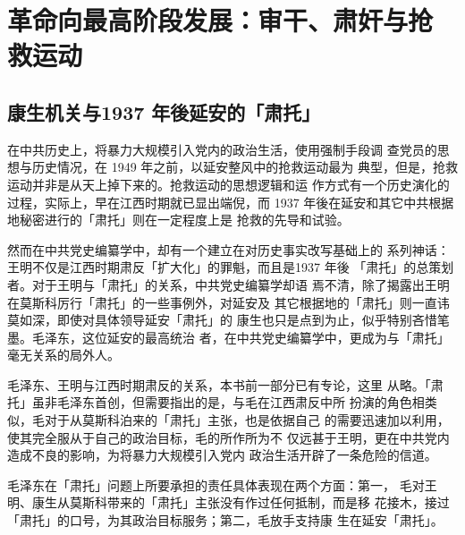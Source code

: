 \chapter{
革命向最高阶段发展：审干、肃奸与抢
救运动}

\section{康生机关与1937 年後延安的「肃托」}

在中共历史上，将暴力大规模引入党内的政治生活，使用强制手段调
查党员的思想与历史情况，在 1949 年之前，以延安整风中的抢救运动最为
典型，但是，抢救运动并非是从天上掉下来的。抢救运动的思想逻辑和运
作方式有一个历史演化的过程，实际上，早在江西时期就已显出端倪，而
1937 年後在延安和其它中共根据地秘密进行的「肃托」则在一定程度上是
抢救的先导和试验。
 
然而在中共党史编纂学中，却有一个建立在对历史事实改写基础上的
系列神话：王明不仅是江西时期肃反「扩大化」的罪魁，而且是1937 年後
「肃托」的总策划者。对于王明与「肃托」的关系，中共党史编纂学却语
焉不清，除了揭露出王明在莫斯科厉行「肃托」的一些事例外，对延安及
其它根据地的「肃托」则一直讳莫如深，即使对具体领导延安「肃托」的
康生也只是点到为止，似乎特别吝惜笔墨。毛泽东，这位延安的最高统治
者，在中共党史编纂学中，更成为与「肃托」毫无关系的局外人。
 
毛泽东、王明与江西时期肃反的关系，本书前一部分已有专论，这里
从略。「肃托」虽非毛泽东首创，但需要指出的是，与毛在江西肃反中所
扮演的角色相类似，毛对于从莫斯科泊来的「肃托」主张，也是依据自己
的需要迅速加以利用，使其完全服从于自己的政治目标，毛的所作所为不
仅远甚于王明，更在中共党内造成不良的影响，为将暴力大规模引入党内
政治生活开辟了一条危险的信道。

毛泽东在「肃托」问题上所要承担的责任具体表现在两个方面：第一，
毛对王明、康生从莫斯科带来的「肃托」主张没有作过任何抵制，而是移
花接木，接过「肃托」的口号，为其政治目标服务；第二，毛放手支持康
生在延安「肃托」。

